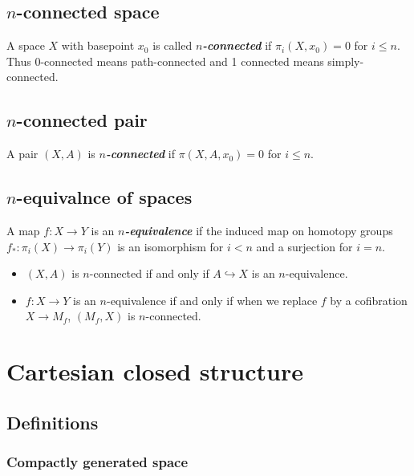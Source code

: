 \subsection{\texorpdfstring{$n$}{n}-connected space}

A space $X$ with basepoint $x_0$ is called \textbf{\textit{$n$-connected}} if $\pi_i(X,x_0)=0$ for $i\leq n$. Thus 0-connected means path-connected and 1 connected means simply-connected.

\subsection{\texorpdfstring{$n$}{n}-connected pair}

A pair $(X,A)$ is \textbf{\textit{$n$-connected}} if $\pi(X,A,x_0)=0$ for $i\leq n$.

\subsection{$n$-equivalnce of spaces}

A map $f:X\to Y$ is an \textit{\textbf{ $n$-equivalence}} if the induced map on homotopy groups $f_{*}:\pi_{i}(X)\to \pi_{i}(Y)$ is an isomorphism for $i<n$ and a surjection for $i=n$.

\begin{remark}\leavevmode
	\begin{itemize}
		\item $(X,A)$ is $n$-connected if and only if $A\hookrightarrow X$ is an $n$-equivalence.
		\item $f:X\to Y$ is an $n$-equivalence if and only if when we replace $f$ by a cofibration $X\to M_{f}$, $(M_{f},X)$ is $n$-connected.
	\end{itemize}
\end{remark}

\section{Cartesian closed structure}

\subsection{Definitions}

\subsubsection{Compactly generated space}

